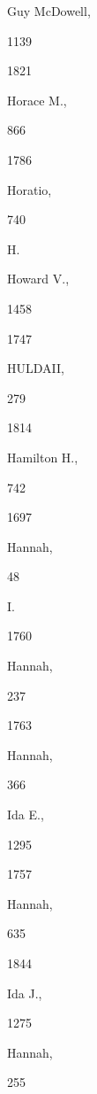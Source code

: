 \documentclass{book}
\begin{document}
{Guy McDowell, 


1139 


1821 


Horace M., 


866 








1786 


Horatio, 


740 




H. 






Howard V., 


1458 








1747 


HULDAII, 


279 


1814 


Hamilton H., 


742 








1697 


Hannah, 


48 




I. 




1760 


Hannah, 


237 








1763 


Hannah, 


366 




Ida E., 


1295 


1757 


Hannah, 


635 


1844 


Ida J., 


1275 




Hannah, 


255 


}
\end{document}
